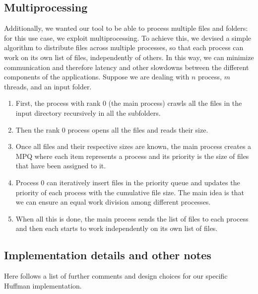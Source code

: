 \subsection{Multiprocessing}
Additionally, we wanted our tool to be able to process multiple files and folders: for this use case, we exploit multiprocessing. To achieve this, we devised a simple algorithm to distribute files across multiple processes, so that each process can work on its own list of files, independently of others. In this way, we can minimize communication and therefore latency and other slowdowns between the different components of the applications. Suppose we are dealing with \(n\) process, \(m\) threads, and an input folder.

\begin{enumerate}
	\item First, the process with rank 0 (the main process) crawls all the files in the input directory recursively in all the subfolders.
	\item Then the rank 0 process opens all the files and reads their size.
	\item Once all files and their respective sizes are known, the main process creates a MPQ where each item represents a process and its priority is the size of files that have been assigned to it.
	\item Process 0 can iteratively insert files in the priority queue and updates the priority of each process with the cumulative file size. The main idea is that we can ensure an equal work division among different processes.
	\item When all this is done, the main process sends the list of files to each process and then each starts to work independently on its own list of files.
\end{enumerate}

\subsection{Implementation details and other notes}
Here follows a list of further comments and design choices for our specific Huffman implementation. 

